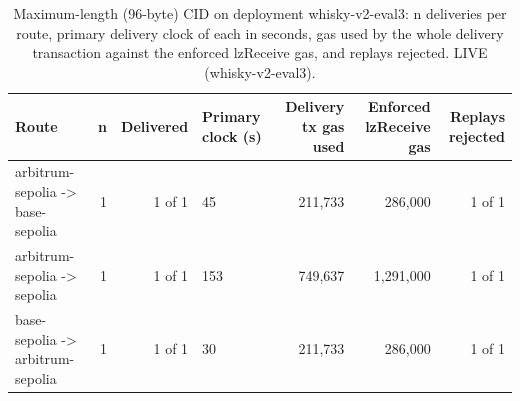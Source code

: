 \begin{table}[htbp]
    \centering
    \small
    \begin{tabular}{lrrlrrr}
    \toprule
    Route & n & Delivered & Primary clock (s) & Delivery tx gas used & Enforced lzReceive gas & Replays rejected \\
    \midrule
    arbitrum-sepolia -> base-sepolia & 1 & 1 of 1 & 45 & 211,733 & 286,000 & 1 of 1 \\
    arbitrum-sepolia -> sepolia & 1 & 1 of 1 & 153 & 749,637 & 1,291,000 & 1 of 1 \\
    base-sepolia -> arbitrum-sepolia & 1 & 1 of 1 & 30 & 211,733 & 286,000 & 1 of 1 \\
    \bottomrule
    \end{tabular}
    \caption{Maximum-length (96-byte) CID on deployment whisky-v2-eval3: n deliveries per route, primary delivery clock of each in seconds, gas used by the whole delivery transaction against the enforced lzReceive gas, and replays rejected. LIVE (whisky-v2-eval3).}
    \label{tab:edge-maxcid}
\end{table}
